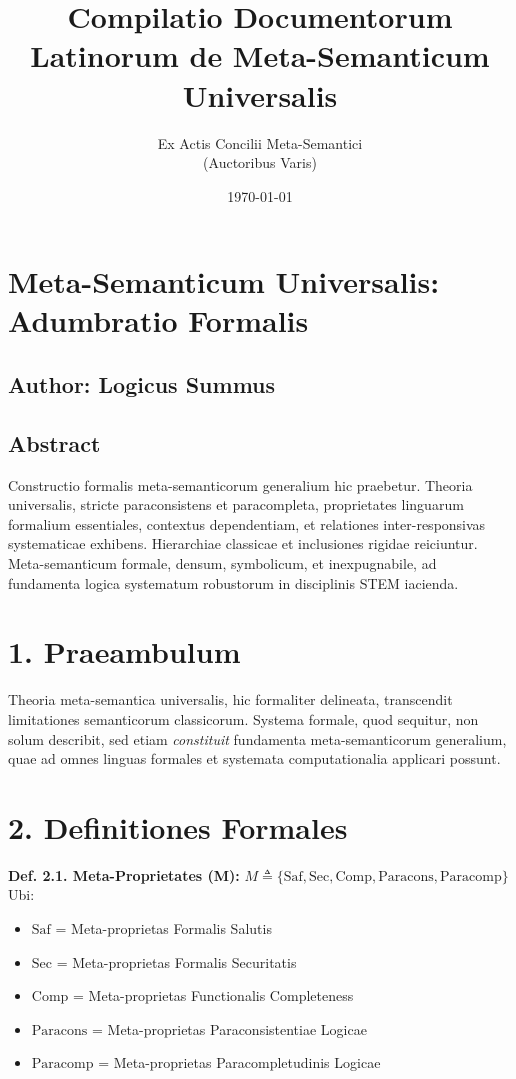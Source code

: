 \documentclass{article}
\title{Compilatio Documentorum Latinorum de Meta-Semanticum Universalis}
\author{Ex Actis Concilii Meta-Semantici\\ (Auctoribus Varis)}
\date{\today}
\begin{document}
	
	\maketitle
	
	\section{Meta-Semanticum Universalis: Adumbratio Formalis}
	\label{sec:adumbratio}
	
	\subsection*{Author: Logicus Summus}
	
	\subsection*{Abstract}
	Constructio formalis meta-semanticorum generalium hic praebetur. Theoria universalis, stricte paraconsistens et paracompleta, proprietates linguarum formalium essentiales, contextus dependentiam, et relationes inter-responsivas systematicae exhibens. Hierarchiae classicae et inclusiones rigidae reiciuntur. Meta-semanticum formale, densum, symbolicum, et inexpugnabile, ad fundamenta logica systematum robustorum in disciplinis STEM iacienda.
	
	\section*{1. Praeambulum}
	Theoria meta-semantica universalis, hic formaliter delineata, transcendit limitationes semanticorum classicorum. Systema formale, quod sequitur, non solum describit, sed etiam \textit{constituit} fundamenta meta-semanticorum generalium, quae ad omnes linguas formales et systemata computationalia applicari possunt.
	
	\section*{2. Definitiones Formales}
	\textbf{Def. 2.1. Meta-Proprietates (M):}
	$M \triangleq \{ \text{Saf}, \text{Sec}, \text{Comp}, \text{Paracons}, \text{Paracomp} \}$
	Ubi:
	\begin{itemize}
		\item $\text{Saf}$ = Meta-proprietas Formalis Salutis
		\item $\text{Sec}$ = Meta-proprietas Formalis Securitatis
		\item $\text{Comp}$ = Meta-proprietas Functionalis Completeness
		\item $\text{Paracons}$ = Meta-proprietas Paraconsistentiae Logicae
		\item $\text{Paracomp}$ = Meta-proprietas Paracompletudinis Logicae
	\end{itemize}
	
\end{document}
